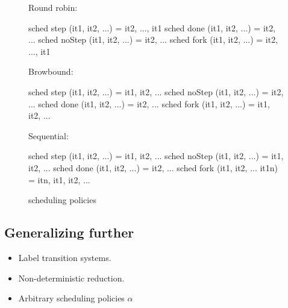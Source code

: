 \begin{figure}
  Round robin:
\begin{code}
  sched step (it1, it2, ...)    = {it2, ..., it1}
  sched done (it1, it2, ...)    = {it2, ...}
  sched noStep (it1, it2, ...)  = {it2, ...}
  sched fork (it1, it2, ...)    = {it2, ..., it1}
\end{code}
  Browbound:
\begin{code}
  sched step (it1, it2, ...)    = {it1, it2, ...}
  sched noStep (it1, it2, ...)  = {it2, ...}
  sched done (it1, it2, ...)    = {it2, ...}
  sched fork (it1, it2, ...)    = {it1, it2, ...}
\end{code}
  Sequential:
\begin{code}
  sched step (it1, it2, ...)       = {it1, it2, ...}
  sched noStep (it1, it2, ...)     = {it1, it2, ...}
  sched done (it1, it2, ...)       = {it2, ...}
  sched fork (it1, it2, ... it1n)  = {itn, it1, it2, ...}
\end{code}
\caption{scheduling policies}
\end{figure}


\subsection{Generalizing further}

\begin{itemize}
\item Label transition systems.
\item Non-deterministic reduction.
\item Arbitrary scheduling policies $\alpha$
\end{itemize}
